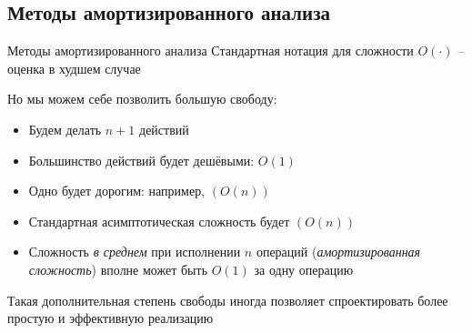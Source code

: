 \subsection{Методы амортизированного анализа}
\label{sc:5.1}


\begin{frame}{Методы амортизированного анализа}
Стандартная нотация для сложности $O(\cdot)$ -- оценка в худшем случае
\vspace{2em}

Но мы можем себе позволить большую свободу:
\begin{itemize}
\item Будем делать $n+1$ действий
\item Большинство действий будет дешёвыми: $O(1)$
\item Одно будет дорогим: например, $(O(n))$
\item Стандартная асимптотическая сложность будет $(O(n))$
\item Сложность \textit{в среднем} при исполнении $n$ операций (\textit{амортизированная сложность}) вполне может быть $O(1)$ за одну операцию
\end{itemize}
\vspace{2em}



Такая дополнительная степень свободы иногда позволяет спроектировать более простую и эффективную реализацию

\end{frame}


%


